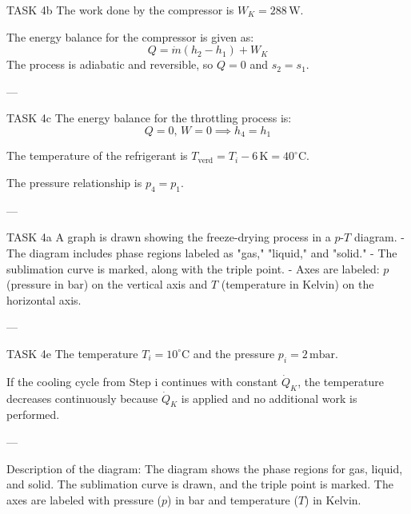TASK 4b  
The work done by the compressor is \( W_K = 288 \, \text{W} \).  

The energy balance for the compressor is given as:  
\[
Q = \dot{m} \left( h_2 - h_1 \right) + W_K
\]  
The process is adiabatic and reversible, so \( Q = 0 \) and \( s_2 = s_1 \).  

---

TASK 4c  
The energy balance for the throttling process is:  
\[
Q = 0, \, W = 0 \implies h_4 = h_1
\]  

The temperature of the refrigerant is \( T_{\text{verd}} = T_i - 6 \, \text{K} = 40^\circ\text{C} \).  

The pressure relationship is \( p_4 = p_1 \).  

---

TASK 4a  
A graph is drawn showing the freeze-drying process in a \( p \)-\( T \) diagram.  
- The diagram includes phase regions labeled as "gas," "liquid," and "solid."  
- The sublimation curve is marked, along with the triple point.  
- Axes are labeled: \( p \) (pressure in bar) on the vertical axis and \( T \) (temperature in Kelvin) on the horizontal axis.  

---

TASK 4e  
The temperature \( T_i = 10^\circ\text{C} \) and the pressure \( p_i = 2 \, \text{mbar} \).  

If the cooling cycle from Step i continues with constant \( \dot{Q}_K \), the temperature decreases continuously because \( \dot{Q}_K \) is applied and no additional work is performed.  

---

Description of the diagram:  
The diagram shows the phase regions for gas, liquid, and solid. The sublimation curve is drawn, and the triple point is marked. The axes are labeled with pressure (\( p \)) in bar and temperature (\( T \)) in Kelvin.
